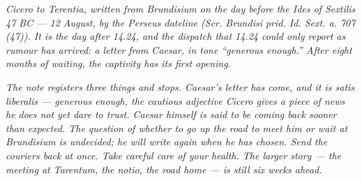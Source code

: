 
\textit{Cicero to Terentia, written from Brundisium on the
day before the Ides of Sextilis 47 BC --- 12 August, by
the Perseus dateline (\textit{Scr. Brundisi prid. Id.
Sext. a. 707 (47)}). It is the day after 14.24, and the
dispatch that 14.24 could only report as rumour has
arrived: a letter from Caesar, in tone ``generous
enough.'' After eight months of waiting, the captivity
has its first opening.}

\textit{The note registers three things and stops.
Caesar's letter has come, and it is \textit{satis
liberalis} --- generous enough, the cautious adjective
Cicero gives a piece of news he does not yet dare to
trust. Caesar himself is said to be coming back sooner
than expected. The question of whether to go up the
road to meet him or wait at Brundisium is undecided; he
will write again when he has chosen. Send the couriers
back at once. Take careful care of your health. The
larger story --- the meeting at Tarentum, the
\textit{notio}, the road home --- is still six weeks
ahead.}
